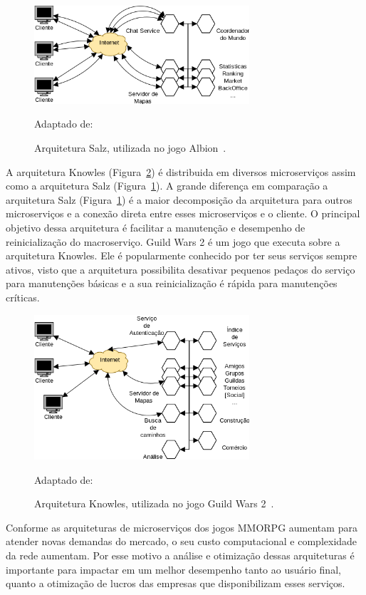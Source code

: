 \begin{figure}[htb!]
  \caption{Arquitetura Salz, utilizada no jogo Albion~\cite{albion_online_unite}.}
  \label{fig:salz}
  \includegraphics[width=8cm]{arquiteturas/salz.png}
  \centering

  Adaptado de:~\cite{albion_online_unite}
\end{figure}

A arquitetura Knowles (Figura~\ref{fig:knowles}) é distribuida em diversos microserviços assim como a arquitetura Salz (Figura~\ref{fig:salz}).
%
A grande diferença em comparação a arquitetura Salz (Figura~\ref{fig:salz}) é a maior decomposição da arquitetura para outros microserviços e a conexão direta entre esses microserviços e o cliente.
%
O principal objetivo dessa arquitetura é facilitar a manutenção e desempenho de reinicialização do macroserviço\cite{stephenclarkewillson2017}.
%
Guild Wars 2 é um jogo que executa sobre a arquitetura Knowles.
%
Ele é popularmente conhecido por ter seus serviços sempre ativos, visto que a arquitetura possibilita desativar pequenos pedaços do serviço para manutenções básicas e a sua reinicialização é rápida para manutenções críticas.

\begin{figure}[htb!]
  \caption{Arquitetura Knowles, utilizada no jogo Guild Wars 2~\cite{stephenclarkewillson2017}.}
  \label{fig:knowles}
  \includegraphics[width=8cm]{arquiteturas/knowles.png}
  \centering

  Adaptado de:~\cite{stephenclarkewillson2017}
\end{figure}

Conforme as arquiteturas de microserviços dos jogos \ac{MMORPG} aumentam para atender novas demandas do mercado, o seu custo computacional e complexidade da rede aumentam.
%
Por esse motivo a análise e otimização dessas arquiteturas é importante para impactar em um melhor desempenho tanto ao usuário final, quanto a otimização de lucros das empresas que disponibilizam esses serviços.

